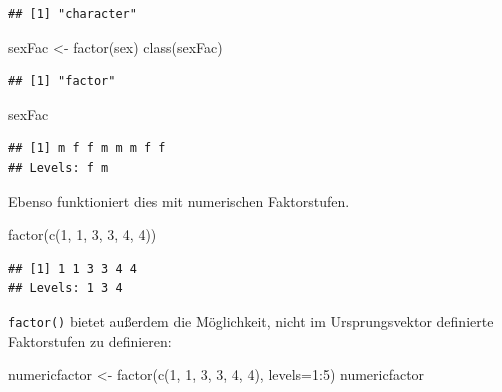\documentclass[
]{book}
\newenvironment{Shaded}{\begin{snugshade}}{\end{snugshade}}
\newcommand{\AttributeTok}[1]{\textcolor[rgb]{0.77,0.63,0.00}{#1}}
\newcommand{\DecValTok}[1]{\textcolor[rgb]{0.00,0.00,0.81}{#1}}
\newcommand{\FunctionTok}[1]{\textcolor[rgb]{0.00,0.00,0.00}{#1}}
\newcommand{\NormalTok}[1]{#1}
\newcommand{\OtherTok}[1]{\textcolor[rgb]{0.56,0.35,0.01}{#1}}
\newcommand{\SpecialCharTok}[1]{\textcolor[rgb]{0.00,0.00,0.00}{#1}}
\begin{document}
\begin{verbatim}
## [1] "character"
\end{verbatim}

\begin{Shaded}
\begin{Highlighting}[]
\NormalTok{sexFac  }\OtherTok{\textless{}{-}}  \FunctionTok{factor}\NormalTok{(sex)}
\FunctionTok{class}\NormalTok{(sexFac)}
\end{Highlighting}
\end{Shaded}

\begin{verbatim}
## [1] "factor"
\end{verbatim}

\begin{Shaded}
\begin{Highlighting}[]
\NormalTok{sexFac }
\end{Highlighting}
\end{Shaded}

\begin{verbatim}
## [1] m f f m m m f f
## Levels: f m
\end{verbatim}

Ebenso funktioniert dies mit numerischen Faktorstufen.

\begin{Shaded}
\begin{Highlighting}[]
\FunctionTok{factor}\NormalTok{(}\FunctionTok{c}\NormalTok{(}\DecValTok{1}\NormalTok{, }\DecValTok{1}\NormalTok{, }\DecValTok{3}\NormalTok{, }\DecValTok{3}\NormalTok{, }\DecValTok{4}\NormalTok{, }\DecValTok{4}\NormalTok{))}
\end{Highlighting}
\end{Shaded}

\begin{verbatim}
## [1] 1 1 3 3 4 4
## Levels: 1 3 4
\end{verbatim}

\texttt{factor()} bietet außerdem die Möglichkeit, nicht im Ursprungsvektor definierte Faktorstufen zu definieren:

\begin{Shaded}
\begin{Highlighting}[]
\NormalTok{numericfactor }\OtherTok{\textless{}{-}} \FunctionTok{factor}\NormalTok{(}\FunctionTok{c}\NormalTok{(}\DecValTok{1}\NormalTok{, }\DecValTok{1}\NormalTok{, }\DecValTok{3}\NormalTok{, }\DecValTok{3}\NormalTok{, }\DecValTok{4}\NormalTok{, }\DecValTok{4}\NormalTok{), }\AttributeTok{levels=}\DecValTok{1}\SpecialCharTok{:}\DecValTok{5}\NormalTok{)}
\NormalTok{numericfactor}
\end{Highlighting}
\end{Shaded}
\end{document}
